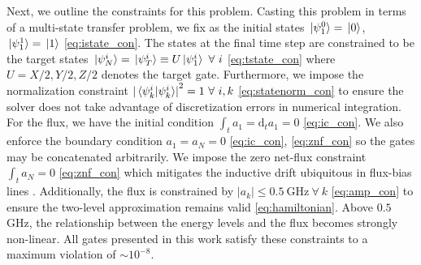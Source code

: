 Next, we outline the constraints for this problem.
Casting this problem in terms of a multi-state transfer problem, we fix as the initial states
 $\ket*{\psi^{0}_{1}} = \ket*{0}$, $\ket*{\psi^{1}_{1}} = \ket*{1}$
\eqref{eq:istate_con}.
The states at the final time step are constrained to be
the target states $\ket*{\psi^{i}_{N}} = \ket*{\psi^{i}_{T}} \equiv
U \ket*{\psi^{i}_{1}} \ \forall \ i$
\eqref{eq:tstate_con} where $U = X/2, Y/2, Z/2$ denotes the target gate.
Furthermore, we impose the normalization constraint
${\lvert \braket*{\psi^{i}_{k}}{\psi^{i}_{k}} \rvert}^{2} = 1 \ \forall \ i,k$
\eqref{eq:statenorm_con}
to ensure the solver does not take advantage of discretization errors in numerical integration.
For the flux,
we have the initial condition $\int_{t} a_{1} = \mathrm{d}_{t} a_{1} = 0$
\eqref{eq:ic_con}.
We also enforce the boundary condition $a_{1} = a_{N} = 0$ \eqref{eq:ic_con}, \eqref{eq:znf_con}
so the gates may be concatenated arbitrarily. 
We impose the zero net-flux constraint $\int_{t} a_{N} = 0$
\eqref{eq:znf_con}
which mitigates the inductive drift ubiquitous in flux-bias lines
\cite{battistel2019fast, krantz2019quantum, zhang2020universal}.
Additionally, the flux is constrained by $\lvert a_{k} \rvert \leq 0.5 \ \textrm{GHz}
\ \forall \ k$ \eqref{eq:amp_con} to ensure the two-level
approximation remains valid \eqref{eq:hamiltonian}. Above $0.5$ GHz,
the relationship between the energy levels and the flux becomes strongly non-linear.
All gates presented in this work satisfy these constraints to
a maximum violation of $\sim 10^{-8}$.

